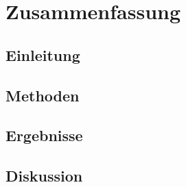 \section*{Zusammenfassung}
\subsection*{Einleitung}
\lipsum[1]
\subsection*{Methoden}
\lipsum[1]
\subsection*{Ergebnisse}
\lipsum[1]
\subsection*{Diskussion}
\lipsum[1]